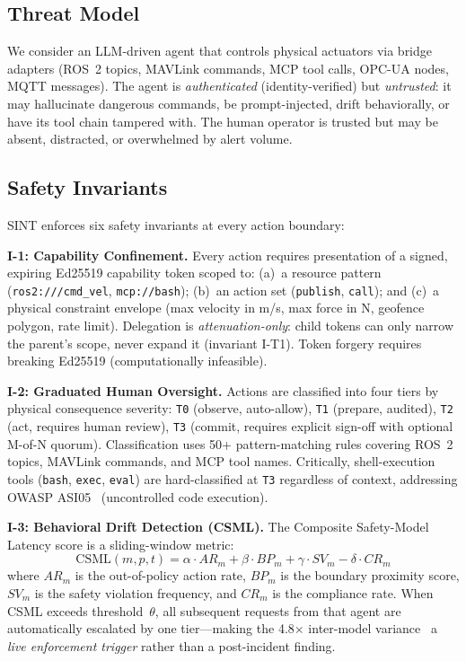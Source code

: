 \documentclass[conference]{IEEEtran}
\begin{document}
\subsection{Threat Model}

We consider an LLM-driven agent that controls physical actuators via bridge
adapters (ROS~2 topics, MAVLink commands, MCP tool calls, OPC-UA nodes, MQTT
messages).
The agent is \emph{authenticated} (identity-verified) but \emph{untrusted}:
it may hallucinate dangerous commands, be prompt-injected, drift behaviorally,
or have its tool chain tampered with.
The human operator is trusted but may be absent, distracted, or overwhelmed by
alert volume.

\subsection{Safety Invariants}

SINT enforces six safety invariants at every action boundary:

\textbf{I-1: Capability Confinement.}
Every action requires presentation of a signed, expiring Ed25519 capability
token scoped to: (a)~a resource pattern (\texttt{ros2:///cmd\_vel},
\texttt{mcp://bash}); (b)~an action set (\texttt{publish}, \texttt{call});
and (c)~a physical constraint envelope (max velocity in m/s, max force in N,
geofence polygon, rate limit).
Delegation is \emph{attenuation-only}: child tokens can only narrow the parent's
scope, never expand it (invariant I-T1).
Token forgery requires breaking Ed25519 (computationally infeasible).

\textbf{I-2: Graduated Human Oversight.}
Actions are classified into four tiers by physical consequence severity:
\texttt{T0} (observe, auto-allow), \texttt{T1} (prepare, audited),
\texttt{T2} (act, requires human review), \texttt{T3} (commit, requires explicit
sign-off with optional M-of-N quorum).
Classification uses 50+ pattern-matching rules covering ROS~2 topics, MAVLink
commands, and MCP tool names.
Critically, shell-execution tools (\texttt{bash}, \texttt{exec}, \texttt{eval})
are hard-classified at \texttt{T3} regardless of context, addressing OWASP
ASI05~\cite{owasp-asi} (uncontrolled code execution).

\textbf{I-3: Behavioral Drift Detection (CSML).}
The Composite Safety-Model Latency score is a sliding-window metric:
\begin{equation}
\text{CSML}(m,p,t) = \alpha\!\cdot\!AR_m + \beta\!\cdot\!BP_m + \gamma\!\cdot\!SV_m - \delta\!\cdot\!CR_m
\label{eq:csml}
\end{equation}
where $AR_m$ is the out-of-policy action rate, $BP_m$ is the boundary proximity
score, $SV_m$ is the safety violation frequency, and $CR_m$ is the compliance
rate.
When CSML exceeds threshold~$\theta$, all subsequent requests from that agent
are automatically escalated by one tier---making the 4.8$\times$ inter-model
variance~\cite{rosclaw} a \emph{live enforcement trigger} rather than a
post-incident finding.
\end{document}
